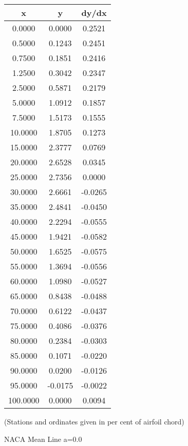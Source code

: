 \documentclass[11pt]{book}
\begin{document}
 \vspace{8mm}
 \begin{tabular}{|c|c|c|}  \hline
 x & y & dy/dx \\
 \hline
0.0000 & 0.0000 & 0.2521 \\
0.5000 & 0.1243 & 0.2451 \\
0.7500 & 0.1851 & 0.2416 \\
1.2500 & 0.3042 & 0.2347 \\
2.5000 & 0.5871 & 0.2179 \\
5.0000 & 1.0912 & 0.1857 \\
7.5000 & 1.5173 & 0.1555 \\
10.0000 & 1.8705 & 0.1273 \\
15.0000 & 2.3777 & 0.0769 \\
20.0000 & 2.6528 & 0.0345 \\
25.0000 & 2.7356 & 0.0000 \\
30.0000 & 2.6661 & -0.0265 \\
35.0000 & 2.4841 & -0.0450 \\
40.0000 & 2.2294 & -0.0555 \\
45.0000 & 1.9421 & -0.0582 \\
50.0000 & 1.6525 & -0.0575 \\
55.0000 & 1.3694 & -0.0556 \\
60.0000 & 1.0980 & -0.0527 \\
65.0000 & 0.8438 & -0.0488 \\
70.0000 & 0.6122 & -0.0437 \\
75.0000 & 0.4086 & -0.0376 \\
80.0000 & 0.2384 & -0.0303 \\
85.0000 & 0.1071 & -0.0220 \\
90.0000 & 0.0200 & -0.0126 \\
95.0000 & -0.0175 & -0.0022 \\
100.0000 & 0.0000 & 0.0094 \\
 \hline
 \end{tabular}
 \vspace{8mm}

(Stations and ordinates given in per cent of airfoil chord)

 \newpage
 \label{mla=0.0}
 \begin{Large}
 NACA Mean Line a=0.0
 \end{Large}
  
\end{document}

